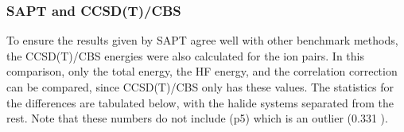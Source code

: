 \begin{multicols}{2}



\subsubsection{SAPT and CCSD(T)/CBS}

To ensure the results given by SAPT agree well with other benchmark methods, the CCSD(T)/CBS energies were also calculated for the ion pairs. 
In this comparison, only the total energy, the HF energy, and the correlation correction can be compared, since CCSD(T)/CBS only has these values. 
The statistics for the differences are tabulated below, with the halide systems separated from the rest.
Note that these numbers do not include  (p5) which is an outlier (0.331 \enUnit).

\end{multicols}

